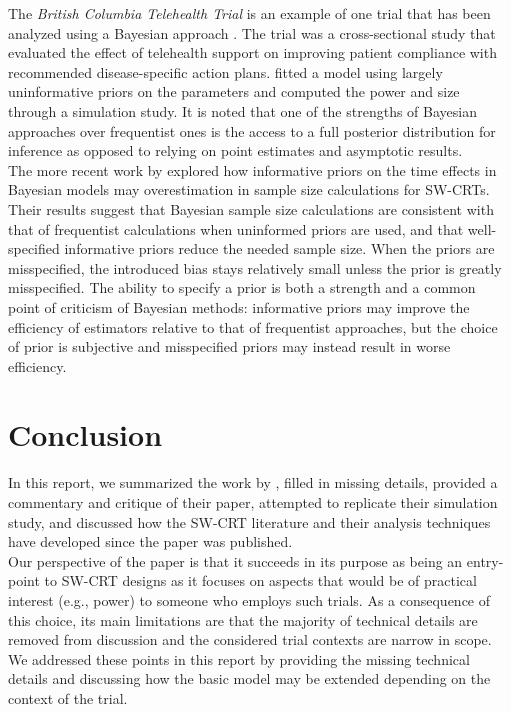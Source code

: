 \documentclass[10pt]{article}
\begin{document}
The \textit{British Columbia Telehealth Trial} is an example of one trial that has been analyzed using a Bayesian approach \parencite{Cunanan:2016}. The trial was a cross-sectional study that evaluated the effect of telehealth support on improving patient compliance with recommended disease-specific action plans. \citeauthor{Cunanan:2016} fitted a model using largely uninformative priors on the parameters and computed the power and size through a simulation study. It is noted that one of the strengths of Bayesian approaches over frequentist ones is the access to a full posterior distribution for inference as opposed to relying on point estimates and asymptotic results.
\\

The more recent work by \textcite{Zhan:2021} explored how informative priors on the time effects in Bayesian models may overestimation in sample size calculations for SW-CRTs. Their results suggest that Bayesian sample size calculations are consistent with that of frequentist calculations when uninformed priors are used, and that well-specified informative priors reduce the needed sample size. When the priors are misspecified, the introduced bias stays relatively small unless the prior is greatly misspecified. The ability to specify a prior is both a strength and a common point of criticism of Bayesian methods: informative priors may improve the efficiency of estimators relative to that of frequentist approaches, but the choice of prior is subjective and misspecified priors may instead result in worse efficiency.


\section{Conclusion} \label{sec:discussion}

In this report, we summarized the work by \textcite{Hussey:2007}, filled in missing details, provided a commentary and critique of their paper, attempted to replicate their simulation study, and discussed how the SW-CRT literature and their analysis techniques have developed since the paper was published.
\\

Our perspective of the paper is that it succeeds in its purpose as being an entry-point to SW-CRT designs as it focuses on aspects that would be of practical interest (e.g., power) to someone who employs such trials. As a consequence of this choice, its main limitations are that the majority of technical details are removed from discussion and the considered trial contexts are narrow in scope. We addressed these points in this report by providing the missing technical details and discussing how the basic model may be extended depending on the context of the trial.
\\
\end{document}
